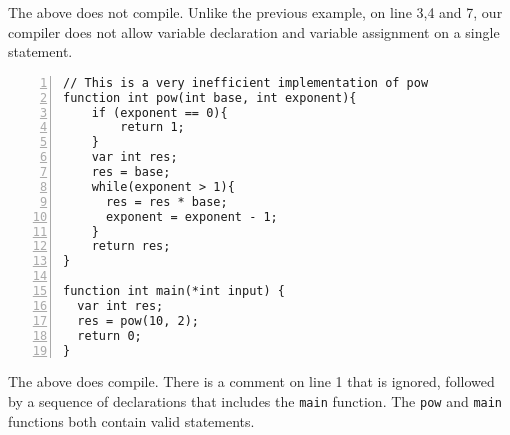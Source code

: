 \documentclass{article}
\begin{document}
The above does not compile. Unlike the previous example, on line 3,4 and 7, our compiler does not allow variable declaration and variable assignment on a single statement.

\begin{Verbatim}[numbers=left,xleftmargin=5mm]
// This is a very inefficient implementation of pow
function int pow(int base, int exponent){
    if (exponent == 0){
        return 1;
    }
    var int res;
    res = base;
    while(exponent > 1){
      res = res * base;
      exponent = exponent - 1;
    }
    return res;
}

function int main(*int input) {
  var int res;
  res = pow(10, 2);
  return 0;
}
\end{Verbatim}
The above does compile. There is a comment on line 1 that is ignored, followed by a sequence of declarations that includes the \verb|main| function. The \verb|pow| and \verb|main| functions both contain valid statements.
\end{document}
